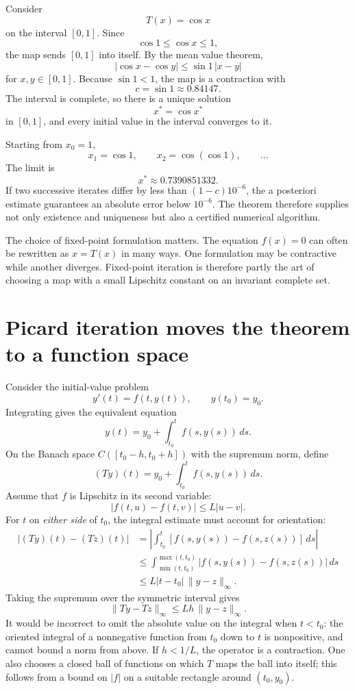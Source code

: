 Consider
\[
  T(x)=\cos x
\]
on the interval \([0,1]\).  Since
\[
  \cos1\le\cos x\le1,
\]
the map sends \([0,1]\) into itself.  By the mean value theorem,
\[
  |\cos x-\cos y|
  \le\sin1\,|x-y|
\]
for \(x,y\in[0,1]\).  Because \(\sin1<1\), the map is a contraction with
\[
  c=\sin1\approx0.84147.
\]
The interval is complete, so there is a unique solution
\[
  x^*=\cos x^*
\]
in \([0,1]\), and every initial value in the interval converges to it.

Starting from \(x_0=1\),
\[
  x_1=\cos1,
  \qquad
  x_2=\cos(\cos1),
  \qquad
  \ldots
\]
The limit is
\[
  x^*\approx0.7390851332.
\]
If two successive iterates differ by less than \((1-c)10^{-6}\), the a posteriori estimate guarantees an absolute error below \(10^{-6}\).  The theorem therefore supplies not only existence and uniqueness but also a certified numerical algorithm.

The choice of fixed-point formulation matters.  The equation \(f(x)=0\) can often be rewritten as \(x=T(x)\) in many ways.  One formulation may be contractive while another diverges.  Fixed-point iteration is therefore partly the art of choosing a map with a small Lipschitz constant on an invariant complete set.

\section{Picard iteration moves the theorem to a function space}

Consider the initial-value problem
\[
  y'(t)=f(t,y(t)),
  \qquad
  y(t_0)=y_0.
\]
Integrating gives the equivalent equation
\[
  y(t)=y_0+\int_{t_0}^{t}f(s,y(s))\,ds.
\]
On the Banach space \(C([t_0-h,t_0+h])\) with the supremum norm, define
\[
  (Ty)(t)
  =y_0+\int_{t_0}^{t}f(s,y(s))\,ds.
\]
Assume that \(f\) is Lipschitz in its second variable:
\[
  |f(t,u)-f(t,v)|\le L|u-v|.
\]
For $t$ on \emph{either side} of $t_0$, the integral estimate must account for orientation:
\[
\begin{aligned}
 |(Ty)(t)-(Tz)(t)|
 &=\left|\int_{t_0}^{t}
     [f(s,y(s))-f(s,z(s))]\,ds\right|\\
 &\le\int_{\min(t,t_0)}^{\max(t,t_0)}
        |f(s,y(s))-f(s,z(s))|\,ds\\
 &\le L|t-t_0|\,\|y-z\|_\infty.
\end{aligned}
\]
Taking the supremum over the symmetric interval gives
\[
 \boxed{\|Ty-Tz\|_\infty\le Lh\,\|y-z\|_\infty.}
\]
It would be incorrect to omit the absolute value on the integral when $t<t_0$: the oriented integral of a nonnegative function from $t_0$ down to $t$ is nonpositive, and cannot bound a norm from above.
If \(h<1/L\), the operator is a contraction.  One also chooses a closed ball of functions on which \(T\) maps the ball into itself; this follows from a bound on \(|f|\) on a suitable rectangle around \((t_0,y_0)\).

